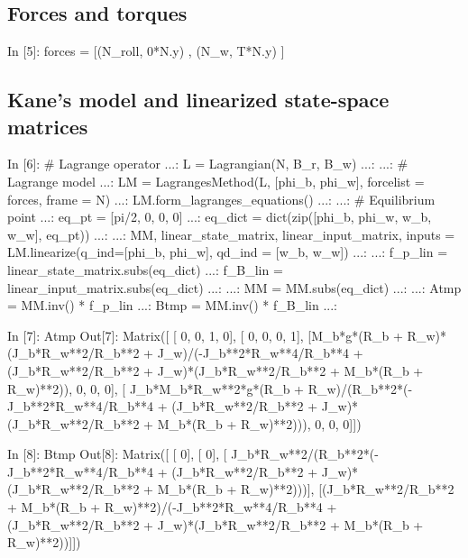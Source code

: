 \subsection{Forces and torques}
\begin{code}
In [5]: forces = [(N_roll, 0*N.y) , (N_w, T*N.y) ]
\end{code}

\subsection{Kane's model and linearized state-space matrices}
\begin{code}
In [6]: # Lagrange operator
   ...: L = Lagrangian(N,  B_r,  B_w)
   ...: 
   ...: # Lagrange model
   ...: LM = LagrangesMethod(L, [phi_b, phi_w], forcelist = forces,   frame = N)
   ...: LM.form_lagranges_equations()
   ...: 
   ...: # Equilibrium point
   ...: eq_pt = [pi/2, 0, 0, 0]
   ...: eq_dict = dict(zip([phi_b, phi_w, w_b, w_w], eq_pt))
   ...: 
   ...: MM, linear_state_matrix, linear_input_matrix, inputs = LM.linearize(q_ind=[phi_b, phi_w], qd_ind = [w_b, w_w])
   ...: 
   ...: f_p_lin = linear_state_matrix.subs(eq_dict)
   ...: f_B_lin = linear_input_matrix.subs(eq_dict)
   ...: 
   ...: MM = MM.subs(eq_dict)
   ...: 
   ...: Atmp = MM.inv() * f_p_lin
   ...: Btmp = MM.inv() * f_B_lin
   ...: 

\end{code}

\begin{code}
In [7]: Atmp
Out[7]: 
Matrix([
[                                                                                                                                       0, 0, 1, 0],
[                                                                                                                                       0, 0, 0, 1],
[M_b*g*(R_b + R_w)*(J_b*R_w**2/R_b**2 + J_w)/(-J_b**2*R_w**4/R_b**4 + (J_b*R_w**2/R_b**2 + J_w)*(J_b*R_w**2/R_b**2 + M_b*(R_b + R_w)**2)), 0, 0, 0],
[      J_b*M_b*R_w**2*g*(R_b + R_w)/(R_b**2*(-J_b**2*R_w**4/R_b**4 + (J_b*R_w**2/R_b**2 + J_w)*(J_b*R_w**2/R_b**2 + M_b*(R_b + R_w)**2))), 0, 0, 0]])

In [8]: Btmp
Out[8]: 
Matrix([
[                                                                                                                                    0],
[                                                                                                                                    0],
[                     J_b*R_w**2/(R_b**2*(-J_b**2*R_w**4/R_b**4 + (J_b*R_w**2/R_b**2 + J_w)*(J_b*R_w**2/R_b**2 + M_b*(R_b + R_w)**2)))],
[(J_b*R_w**2/R_b**2 + M_b*(R_b + R_w)**2)/(-J_b**2*R_w**4/R_b**4 + (J_b*R_w**2/R_b**2 + J_w)*(J_b*R_w**2/R_b**2 + M_b*(R_b + R_w)**2))]])
\end{code}

